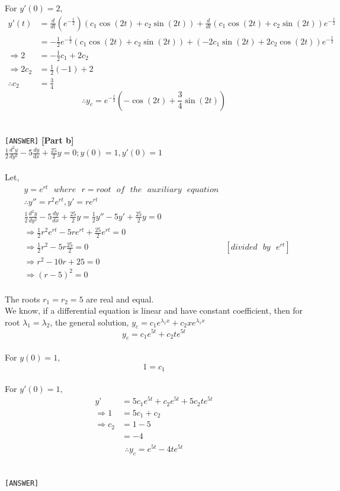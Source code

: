 \documentclass{article}
\newcommand\tab[1][1cm]{\hspace*{#1}}
\begin{document}
\begin{homeworkProblem}
For $y'(0)=2,$
\begin{align*}
    y'(t)&=\frac{d}{dt} (e^{-\frac{t}{2}})(c_1\cos (2t)+c_2\sin (2t))+\frac{d}{dt}(c_1\cos (2t)+c_2\sin (2t))e^{-\frac{t}{2}}\\
    &=-\frac{1}{2} e^{-\frac{t}{2}}(c_1\cos (2t)+c_2\sin (2t))+(-2c_1\sin (2t)+2c_2\cos (2t))e^{-\frac{t}{2}}\\
    \Rightarrow 2&=-\frac{1}{2}c_1+2c_2\\
    \Rightarrow 2c_2&=\frac{1}{2}(-1)+2\\
    \therefore c_2&=\frac{3}{4}
\end{align*}
$$\therefore y_c=e^{-\frac{t}{2}}(-\cos (2t)+\frac{3}{4}\sin (2t))$$\\
\vspace{3mm}\\
\tab\tab\tab \texttt{[ANSWER]}
\newpage
\textbf{[Part b]}
\\
\tab$\frac{1}{2}\frac{d^2y}{dy^2}-5\frac{dy}{dx}+\frac{25}{2}y=0;y(0)=1,y'(0)=1$\\
\vspace{5mm}\\
Let,
\begin{align*}
    &y=e^{rt}\:\:\:where\:\:\:r=root\:\:\:of\:\:\:the\:\:\:auxiliary\:\:\:equation\\
    &\therefore y''=r^2 e^{rt},y'=r e^{rt}\\
    &\frac{1}{2}\frac{d^2y}{dy^2}-5\frac{dy}{dx}+\frac{25}{2}y=\frac{1}{2} y''-5y'+\frac{25}{2}y=0\\
    &\Rightarrow \frac{1}{2}r^2 e^{rt}-5r e^{rt}+\frac{25}{2}e^{rt}=0\\
    &\Rightarrow \frac{1}{2}r^2-5r\frac{25}{2}=0 &[divided\:\:\:by\:\:\:e^{rt}]\\
    &\Rightarrow r^2-10r+25=0\\
    &\Rightarrow(r-5)^2=0
\end{align*}\\
The roots $r_1=r_2=5$ are real and equal.\\
We know, if a differential equation is linear and have constant coefficient, then for root $\lambda_1=\lambda_2$, the general solution, $y_c=c_1 e^{\lambda_1x}+c_2 xe^{\lambda_1x}$
$$y_c=c_1e^{5t}+c_2 te^{5t}$$\\
For $y(0)=1,$\\
   $$1=c_1$$\\
For $y'(0)=1,$
\begin{align*}
y’&=5c_1 e^{5t}+c_2 e^{5t}+5c_2 te^{5t}\\
\Rightarrow 1&=5c_1+c_2\\
\Rightarrow c_2&=1-5\\
&=-4\\
\end{align*}
$$\therefore y_c=e^{5t}-4te^{5t}$$\\
\vspace{3mm}\\
\tab\tab\tab \texttt{[ANSWER]}
\end{homeworkProblem}
\pagebreak
\end{document}
